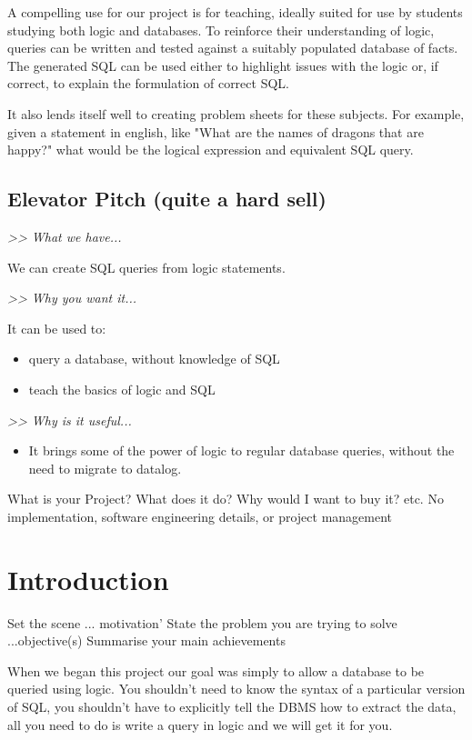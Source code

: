 \documentclass[a4paper, 11pt]{article}
\begin{document}
  A compelling use for our project is for teaching, ideally suited for use 
  by students studying both logic and databases. To reinforce their 
  understanding of logic, queries can be written and tested against a suitably
  populated database of facts. The generated SQL can be used either to 
  highlight issues with the logic or, if correct, to explain the formulation
  of correct SQL.

  It also lends itself well to creating problem sheets for these subjects.
  For example, given a statement in english, like "What are the names of
  dragons that are happy?" what would be the logical expression and equivalent
  SQL query.

  \subsection*{Elevator Pitch (quite a hard sell)}
  \emph{>> What we have...}
  
  We can create SQL queries from logic statements.
  
  \emph{>> Why you want it...}

   It can be used to:
   \begin{itemize}
     \item query a database, without knowledge of SQL
     \item teach the basics of logic and SQL
   \end{itemize}

   \emph{>> Why is it useful...}
   \begin{itemize}
     \item It brings some of the power of logic to regular database queries,
     without the need to migrate to datalog.
    \end{itemize}

  What is your Project? What does it do? Why would I want to buy it? etc.
  No implementation, software engineering details, or project management

\section{Introduction}

  Set the scene ... motivation'
  State the problem you are trying to solve ...objective(s)
  Summarise your main achievements 

When we began this project our goal was simply to allow a database to be 
queried using logic. You shouldn't need to know the syntax of a particular
version of SQL, you shouldn't have to explicitly tell the DBMS how to extract
the data, all you need to do is write a query in logic and we will
get it for you.
\end{document}
